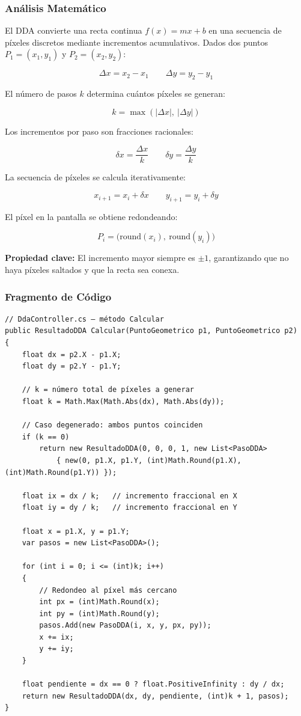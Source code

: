 \documentclass[
  spanish,
  a4paper,
  12pt,
]{article}
\begin{document}
\subsubsection{Análisis Matemático}\label{anuxe1lisis-matemuxe1tico}

El DDA convierte una recta continua \(f(x) = mx + b\) en una secuencia
de píxeles discretos mediante incrementos acumulativos. Dados dos puntos
\(P_1 = (x_1, y_1)\) y \(P_2 = (x_2, y_2)\):

\[\Delta x = x_2 - x_1 \qquad \Delta y = y_2 - y_1\]

El número de pasos \(k\) determina cuántos píxeles se generan:

\[k = \max(|\Delta x|,\ |\Delta y|)\]

Los incrementos por paso son fracciones racionales:

\[\delta x = \frac{\Delta x}{k} \qquad \delta y = \frac{\Delta y}{k}\]

La secuencia de píxeles se calcula iterativamente:

\[x_{i+1} = x_i + \delta x \qquad y_{i+1} = y_i + \delta y\]

El píxel en la pantalla se obtiene redondeando:

\[P_i = \bigl(\text{round}(x_i),\ \text{round}(y_i)\bigr)\]

\textbf{Propiedad clave:} El incremento mayor siempre es \(\pm 1\),
garantizando que no haya píxeles saltados y que la recta sea conexa.

\newpage

\subsubsection{Fragmento de Código}\label{fragmento-de-cuxf3digo}

\begin{lstlisting}
// DdaController.cs — método Calcular
public ResultadoDDA Calcular(PuntoGeometrico p1, PuntoGeometrico p2)
{
    float dx = p2.X - p1.X;
    float dy = p2.Y - p1.Y;

    // k = número total de píxeles a generar
    float k = Math.Max(Math.Abs(dx), Math.Abs(dy));

    // Caso degenerado: ambos puntos coinciden
    if (k == 0)
        return new ResultadoDDA(0, 0, 0, 1, new List<PasoDDA>
            { new(0, p1.X, p1.Y, (int)Math.Round(p1.X), (int)Math.Round(p1.Y)) });

    float ix = dx / k;   // incremento fraccional en X
    float iy = dy / k;   // incremento fraccional en Y

    float x = p1.X, y = p1.Y;
    var pasos = new List<PasoDDA>();

    for (int i = 0; i <= (int)k; i++)
    {
        // Redondeo al píxel más cercano
        int px = (int)Math.Round(x);
        int py = (int)Math.Round(y);
        pasos.Add(new PasoDDA(i, x, y, px, py));
        x += ix;
        y += iy;
    }

    float pendiente = dx == 0 ? float.PositiveInfinity : dy / dx;
    return new ResultadoDDA(dx, dy, pendiente, (int)k + 1, pasos);
}
\end{lstlisting}
\end{document}
